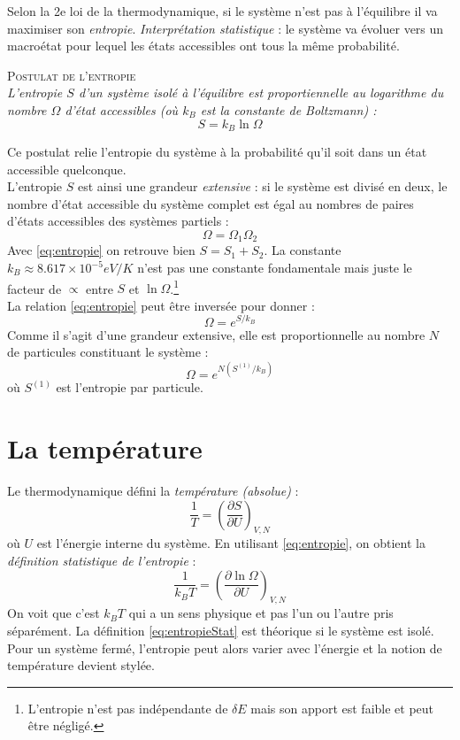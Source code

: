 \documentclass	[11pt, a4paper, openany]{book}
\begin{document}
Selon la 2e loi de la thermodynamique, si le système n'est pas à l'équilibre il va  
maximiser son \textit{entropie}. \textit{Interprétation statistique} : le système va évoluer vers
un macroétat pour lequel les états accessibles ont tous la même probabilité.
\begin{center}
\textsc{Postulat de l'entropie}\\
\textit{L'entropie $S$ d'un système isolé à l'équilibre est proportiennelle au logarithme du nombre
$\Omega$ d'état accessibles (où $k_B$ est la constante de Boltzmann) :}
\begin{equation}
S = k_B\ln\Omega
\label{eq:entropie}
\end{equation}
\end{center}
Ce postulat relie l'entropie du système à la probabilité qu'il soit dans un état accessible 
quelconque.\\
L'entropie $S$ est ainsi une grandeur \textit{extensive} : si le système est divisé en deux, le 
nombre d'état accessible du système complet est égal au nombres de paires d'états accessibles des
systèmes partiels :
\begin{equation}
\Omega = \Omega_1\Omega_2
\end{equation}
Avec \autoref{eq:entropie} on retrouve bien $S = S_1+S_2$. La constante $k_B \approx 8.617\times
10^{-5} eV/K$ n'est pas une constante fondamentale mais juste le facteur de $\propto$ entre $S$
et $\ln\Omega$.\footnote{L'entropie n'est pas indépendante de $\delta E$ mais son apport est 
faible et peut être négligé.}\\

La relation \autoref{eq:entropie} peut être inversée pour donner :
\begin{equation}
\Omega = e^{S/k_B}
\end{equation}
Comme il s'agit d'une grandeur extensive, elle est proportionnelle au nombre $N$ de particules 
constituant le système :
\begin{equation}
\Omega = e^{N(S^{(1)}/k_B)}
\end{equation}
où $S^{(1)}$ est l'entropie par particule.


\section{La température}
Le thermodynamique défini la \textit{température (absolue)} :
\begin{equation}
\frac{1}{T} = \left(\dfrac{\partial S}{\partial U}\right)_{V,N}
\end{equation}
où $U$ est l'énergie interne du système. En utilisant \autoref{eq:entropie}, on obtient la \textit{
définition statistique de l'entropie} :
\begin{equation}
\frac{1}{k_BT} = \left(\dfrac{\partial \ln\Omega}{\partial U}\right)_{V,N}
\label{eq:entropieStat}
\end{equation}
On voit que c'est $k_BT$ qui a un sens physique et pas l'un ou l'autre pris séparément. La 
définition \autoref{eq:entropieStat} est théorique si le système est isolé. Pour un système 
fermé, l'entropie peut alors varier avec l'énergie et la notion de température devient stylée.
\end{document}

